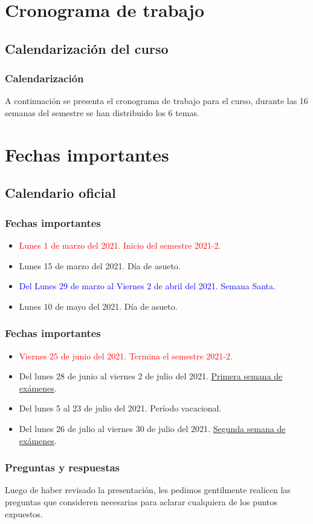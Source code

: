 \section{Cronograma de trabajo}
\subsection{Calendarización del curso}
\begin{frame}
\frametitle{Calendarización}
A continuación se presenta el cronograma de trabajo para el curso, durante las 16 semanas del semestre se han distribuido los 6 temas.
\end{frame}
{

}

\section{Fechas importantes}
\subsection{Calendario oficial}

\begin{frame}
\frametitle{Fechas importantes}
\fontsize{12}{12}\selectfont
\begin{itemize}
\item \textcolor{red}{Lunes 1 de marzo del 2021. Inicio del semestre 2021-2.}
\item Lunes 15 de marzo del 2021. Día de asueto.
\item \textcolor{blue}{Del Lunes 29 de marzo al Viernes 2 de abril del 2021. Semana Santa.}
\item Lunes 10 de mayo del 2021. Día de asueto.
\end{itemize}
\end{frame}
\begin{frame}
\frametitle{Fechas importantes}
\fontsize{12}{12}\selectfont
\begin{itemize}
\item \textcolor{red}{Viernes 25 de junio del 2021. Termina el semestre 2021-2.}
\item Del lunes 28 de junio al viernes 2 de julio del 2021. \underline{Primera semana de exámenes}.
\item Del lunes 5 al 23 de julio del 2021. Período vacacional.
\item Del lunes 26 de julio al viernes 30 de julio del 2021. \underline{Segunda semana de exámenes}.
\end{itemize}
\end{frame}
\begin{frame}
\frametitle{Preguntas y respuestas}
Luego de haber revisado la presentación, les pedimos gentilmente realicen las preguntas que consideren necesarias para aclarar cualquiera de los puntos expuestos.
\end{frame}
